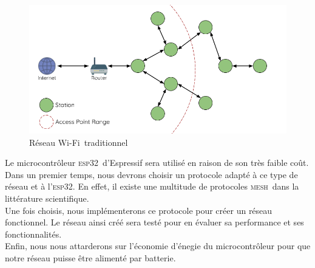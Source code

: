 \documentclass[a4paper, 12pt]{report}
\newcommand{\esp}{\textsc{esp32}}
\newcommand{\mesh}{\textsc{mesh}}
\newcommand{\wifi}{Wi-Fi}
\begin{document}
    \begin{figure}[H]
        \centering
        \includegraphics[scale=0.4]{images/mesh-esp-mesh-network-architecture.png}
        \caption{Réseau \wifi\ traditionnel \cite{esp-mesh_w}}
        \label{mesh-network-pic}
    \end{figure}

    

    Le microcontrôleur \esp\ d'Espressif sera utilisé en raison de son très faible coût.\\

    Dans un premier temps, nous devrons choisir un protocole adapté à ce type
    de réseau et à l'\esp. En effet, il existe une multitude de protocoles
    \mesh\ dans la littérature scientifique.\\

    Une fois choisis, nous implémenterons ce protocole pour créer un
    réseau fonctionnel. Le réseau ainsi créé sera testé pour en évaluer sa performance et ses fonctionnalités.\\

    Enfin, nous nous attarderons sur l'économie d'énegie du microcontrôleur pour
    que notre réseau puisse être alimenté par batterie.



\tableofcontents
\newpage





{}

\end{document}
